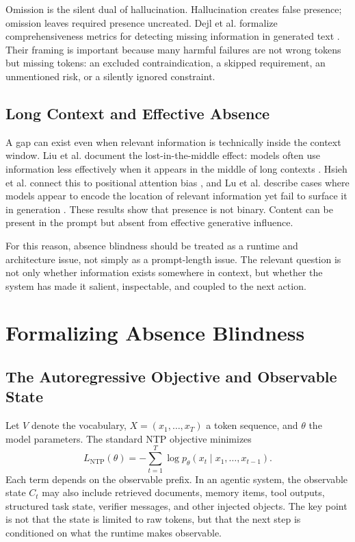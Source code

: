 \documentclass[10pt,conference]{IEEEtran}
\begin{document}
Omission is the silent dual of hallucination. Hallucination creates false presence; omission leaves required presence uncreated. Dejl et al. formalize comprehensiveness metrics for detecting missing information in generated text \cite{dejl2025comprehensiveness}. Their framing is important because many harmful failures are not wrong tokens but missing tokens: an excluded contraindication, a skipped requirement, an unmentioned risk, or a silently ignored constraint.

\subsection{Long Context and Effective Absence}
A gap can exist even when relevant information is technically inside the context window. Liu et al. document the lost-in-the-middle effect: models often use information less effectively when it appears in the middle of long contexts \cite{liu2024lost}. Hsieh et al. connect this to positional attention bias \cite{hsieh2024found}, and Lu et al. describe cases where models appear to encode the location of relevant information yet fail to surface it in generation \cite{lu2024insights}. These results show that presence is not binary. Content can be present in the prompt but absent from effective generative influence.

For this reason, absence blindness should be treated as a runtime and architecture issue, not simply as a prompt-length issue. The relevant question is not only whether information exists somewhere in context, but whether the system has made it salient, inspectable, and coupled to the next action.

\section{Formalizing Absence Blindness}
\subsection{The Autoregressive Objective and Observable State}
Let $V$ denote the vocabulary, $X = (x_1, \ldots, x_T)$ a token sequence, and $\theta$ the model parameters. The standard NTP objective minimizes
\begin{equation}
L_{\mathrm{NTP}}(\theta) = -\sum_{t=1}^{T}\log p_{\theta}(x_t \mid x_1, \ldots, x_{t-1}).
\end{equation}
Each term depends on the observable prefix. In an agentic system, the observable state $C_t$ may also include retrieved documents, memory items, tool outputs, structured task state, verifier messages, and other injected objects. The key point is not that the state is limited to raw tokens, but that the next step is conditioned on what the runtime makes observable.
\end{document}
